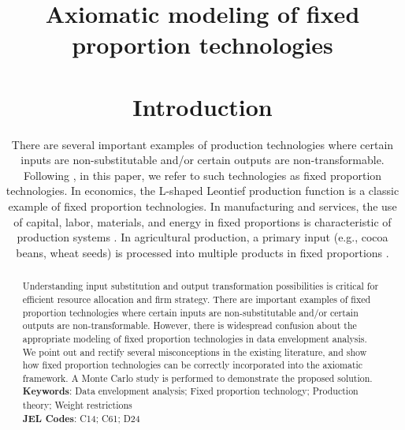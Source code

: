 
\title{\Large\textbf{Axiomatic modeling of fixed proportion technologies}
\maketitle


\begin{abstract}
\noindent 
Understanding input substitution and output transformation possibilities is critical for efficient resource allocation and firm strategy. There are important examples of fixed proportion technologies where certain inputs are non-substitutable and/or certain outputs are non-transformable. However, there is widespread confusion about the appropriate modeling of fixed proportion technologies in data envelopment analysis. We point out and rectify several misconceptions in the existing literature, and show how fixed proportion technologies can be correctly incorporated into the axiomatic framework. A Monte Carlo study is performed to demonstrate the proposed solution.
\\[5mm]
\textbf{Keywords}: Data envelopment analysis; Fixed proportion technology; Production theory; Weight restrictions
\\[2mm]
\textbf{JEL Codes}: C14; C61; D24
\end{abstract}
\vfill

\thispagestyle{empty}
\newpage
\setcounter{page}{1}
\setcounter{footnote}{0}
\baselineskip 20pt
\setlength{}

\section{Introduction}\label{sec:intro}

There are several important examples of production technologies where certain inputs are non-substitutable and/or certain outputs are non-transformable. Following \textcite{Barnum2011}, in this paper, we refer to such technologies as fixed proportion technologies. In economics, the L-shaped Leontief production function is a classic example of fixed proportion technologies. In manufacturing and services, the use of capital, labor, materials, and energy in fixed proportions is characteristic of production systems \parencite{guner_multi-period_2021}. In agricultural production, a primary input (e.g., cocoa beans, wheat seeds) is processed into multiple products in fixed proportions \parencite{Boyabatl2015}. 

}
